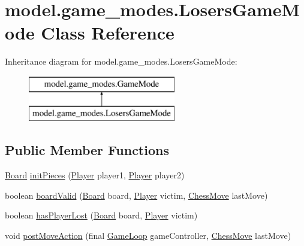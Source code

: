 \hypertarget{classmodel_1_1game__modes_1_1_losers_game_mode}{\section{model.\-game\-\_\-modes.\-Losers\-Game\-Mode Class Reference}
\label{classmodel_1_1game__modes_1_1_losers_game_mode}
}
Inheritance diagram for model.\-game\-\_\-modes.\-Losers\-Game\-Mode\-:\begin{figure}[H]
\begin{center}
\leavevmode
\includegraphics[height=2.000000cm]{classmodel_1_1game__modes_1_1_losers_game_mode}
\end{center}
\end{figure}
\subsection*{Public Member Functions}
\begin{DoxyCompactItemize}
\item 
\hyperlink{classmodel_1_1board_1_1_board}{Board} \hyperlink{classmodel_1_1game__modes_1_1_losers_game_mode_afe481b52ae8b80ab29365c900b898e8b}{init\-Pieces} (\hyperlink{classcontroller_1_1_player}{Player} player1, \hyperlink{classcontroller_1_1_player}{Player} player2)
\item 
boolean \hyperlink{classmodel_1_1game__modes_1_1_losers_game_mode_ab611b89b31571d44240bf530d3944bb0}{board\-Valid} (\hyperlink{classmodel_1_1board_1_1_board}{Board} board, \hyperlink{classcontroller_1_1_player}{Player} victim, \hyperlink{classmodel_1_1_chess_move}{Chess\-Move} last\-Move)
\item 
boolean \hyperlink{classmodel_1_1game__modes_1_1_losers_game_mode_a7bd92bacd7df64fff876670d18c7a751}{has\-Player\-Lost} (\hyperlink{classmodel_1_1board_1_1_board}{Board} board, \hyperlink{classcontroller_1_1_player}{Player} victim)
\item 
void \hyperlink{classmodel_1_1game__modes_1_1_losers_game_mode_a489421b50008405e83cde4655e378b81}{post\-Move\-Action} (final \hyperlink{classcontroller_1_1_game_loop}{Game\-Loop} game\-Controller, \hyperlink{classmodel_1_1_chess_move}{Chess\-Move} last\-Move)
\end{DoxyCompactItemize}


